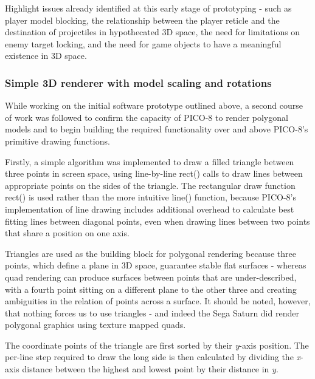 \documentclass{article}
\begin{document}
Highlight issues already identified at this early stage of prototyping - such as
player model blocking, the relationship between the player reticle and the destination
of projectiles in hypothecated 3D space, the need for limitations on enemy
target locking, and the need for game objects to have a meaningful existence in 3D
space.

\subsubsection*{Simple 3D renderer with model scaling and rotations}


While working on the initial software prototype outlined above, a second course of work
was followed to confirm the capacity of PICO-8 to render polygonal models and to begin
building the required functionality over and above PICO-8's primitive drawing functions.

Firstly, a simple algorithm was implemented to draw a filled triangle between three points
in screen space, using line-by-line rect() calls to draw lines between appropriate points on the
sides of the triangle. The rectangular draw function rect() is used
rather than the more intuitive line() function, because PICO-8's implementation of line drawing
includes additional overhead to calculate best fitting lines between diagonal points, even when
drawing lines between two points that share a position on one axis.

Triangles are used as the building block for polygonal rendering because three points, which define
a plane in 3D space, guarantee stable flat surfaces - whereas quad rendering can produce surfaces
between points that are under-described, with a fourth point sitting on a different plane to the
other three and creating ambiguities in the relation of points across a surface. It should be
noted, however, that nothing forces us to use triangles - and indeed the Sega Saturn did render
polygonal graphics using texture mapped quads.


The coordinate points of the triangle are first sorted by their \textit{y}-axis position. The
per-line step required to draw the long side is then calculated by dividing the \textit{x}-axis
distance between the highest and lowest point by their distance in \textit{y}.
\end{document}
